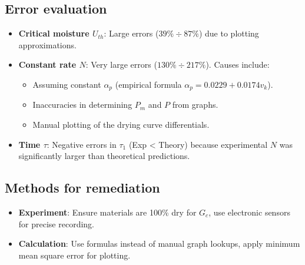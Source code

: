 \subsection{Error evaluation}
\begin{itemize}
    \item \textbf{Critical moisture $U_{th}$}: Large errors ($39\% \div 87\%$) due to plotting approximations.
    \item \textbf{Constant rate $N$}: Very large errors ($130\% \div 217\%$). Causes include:
    \begin{itemize}
        \item Assuming constant $\alpha_p$ (empirical formula $\alpha_p = 0.0229 + 0.0174v_k$).
        \item Inaccuracies in determining $P_m$ and $P$ from graphs.
        \item Manual plotting of the drying curve differentials.
    \end{itemize}
    \item \textbf{Time $\tau$}: Negative errors in $\tau_1$ (Exp < Theory) because experimental $N$ was significantly larger than theoretical predictions.
\end{itemize}

\subsection{Methods for remediation}
\begin{itemize}
    \item \textbf{Experiment}: Ensure materials are 100\% dry for $G_c$, use electronic sensors for precise recording.
    \item \textbf{Calculation}: Use formulas instead of manual graph lookups, apply minimum mean square error for plotting.
\end{itemize}

